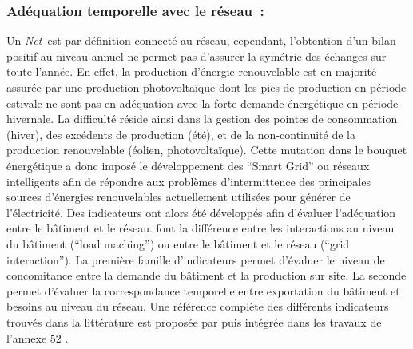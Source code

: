 \subsubsection{Adéquation temporelle avec le réseau~:} %
\label{ssub:adequation_temporelle_avec_le_réseau}
Un \textit{Net}\, est par définition connecté au réseau, cependant, l’obtention
d’un bilan positif au niveau annuel ne permet pas d’assurer la symétrie des échanges sur
toute l’année. En effet, la production d’énergie renouvelable est en majorité assurée par
une production photovoltaïque dont les pics de production en période estivale ne sont pas
en adéquation avec la forte demande énergétique en période hivernale. La difficulté réside
ainsi dans la gestion des pointes de consommation (hiver), des excédents de production
(été), et de la non-continuité de la production renouvelable (éolien, photovoltaïque).
Cette mutation dans le bouquet énergétique a donc imposé le développement des
\enquote{Smart Grid} ou réseaux intelligents afin de répondre aux problèmes d’intermittence
des principales sources d’énergies renouvelables actuellement utilisées pour générer de
l’électricité. Des indicateurs ont alors été développés afin d’évaluer l’adéquation entre
le bâtiment et le réseau. \textcite{Voss2010} font la différence entre les interactions au
niveau du bâtiment (\enquote{load maching}) ou entre le bâtiment et le réseau
(\enquote{grid interaction}). La première famille d’indicateurs permet d’évaluer le niveau
de concomitance entre la demande du bâtiment et la production sur site. La seconde permet
d’évaluer la correspondance temporelle entre exportation du bâtiment et besoins au niveau
du réseau. Une référence complète des différents indicateurs trouvés dans la littérature
est proposée par \textcite{Salom2011} puis intégrée dans les travaux de l’annexe $52$
\parencite{Salom2014}.


